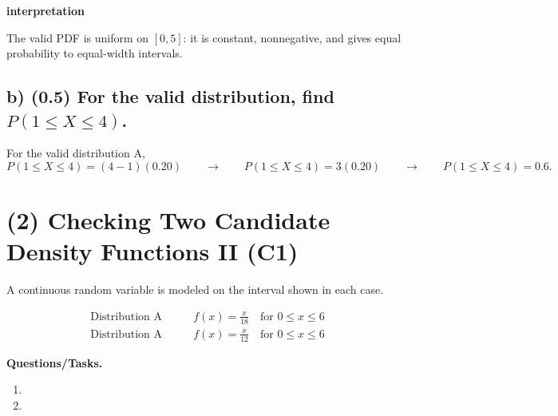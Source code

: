 \textbf{interpretation}


The valid PDF is uniform on $[0,5]$: it is constant, nonnegative, and gives equal probability to equal-width intervals.


\subsection*{b) \textbf{(0.5)} For the valid distribution, find $P(1\le X\le 4)$.}
\label{subsec:checking-three-candidate-density-functions-i-c1-b}
For the valid distribution A,
\[
P(1\le X\le 4)=(4-1)(0.20)\qquad \longrightarrow \qquad P(1\le X\le 4)=3(0.20)\qquad \longrightarrow \qquad P(1\le X\le 4)=0.6.
\]



\section{(2) Checking Two Candidate Density Functions II (C1)}
\label{sec:checking-two-candidate-density-functions-ii-c1}

A continuous random variable is modeled on the interval shown in each case.

\[ \begin{aligned}
\text{Distribution A} & \qquad f(x)=\frac{x}{18}\quad\text{for }0\le x\le 6 \\
\text{Distribution A} & \qquad f(x)=\frac{x}{12}\quad\text{for }0\le x\le 6
\end{aligned} \]

\textbf{Questions/Tasks.}
\begin{enumerate}[label=\textbf{\alph*)}]
	\item {}
	\item {}
\end{enumerate}


